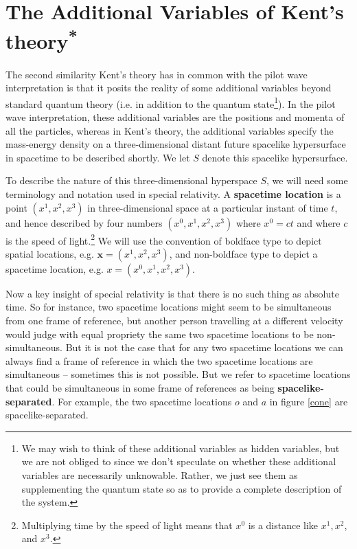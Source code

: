 
\section{The Additional Variables of Kent's theory\textsuperscript{*}\label{additional}}
The second similarity Kent's theory has in common with the pilot wave interpretation is that it posits the reality of some additional variables beyond standard quantum theory (i.e. in addition to the quantum state\footnote{We may wish to think of these additional variables as hidden variables, but we are not obliged to since we don't speculate on whether these additional variables are necessarily unknowable. Rather, we just see them as supplementing the quantum state so as to provide a complete description of the system.}). In the pilot wave interpretation, these additional variables are the positions and momenta of all the particles, whereas in Kent's theory, the additional variables specify the mass-energy density on a three-dimensional distant future spacelike hypersurface in spacetime to be described shortly. We let $S$ denote this spacelike hypersurface.

To describe the nature of this three-dimensional hyperspace $S$, we will need some terminology and notation used in special relativity. A \textbf{spacetime location} is a point $(x^1,x^2,x^3)$ in three-dimensional space at a particular instant of time $t$, and hence described by four numbers $(x^0,x^1,x^2,x^3)$ where $x^0=c t$ and where $c$ is the speed of light.\footnote{Multiplying time by the speed of light means that $x^0$ is a distance like $x^1,x^2$, and $x^3$. } We will use the convention of boldface type to depict spatial locations, e.g. $\bm{x}=(x^1,x^2,x^3)$, and non-boldface type to depict a spacetime location, e.g. $x=(x^0,x^1,x^2,x^3)$. 

Now a key insight of special relativity is that there is no such thing as absolute time. So for instance, two spacetime locations might seem to be simultaneous from one frame of reference, but another person travelling at a different velocity would judge with equal propriety the same two spacetime locations to be non-simultaneous. But it is not the case that for any two spacetime locations we can always find a frame of reference in which the two spacetime locations are simultaneous -- sometimes this is not possible. But we refer to spacetime locations that could be simultaneous in some frame of references as being \textbf{spacelike-separated}. For example, the two spacetime locations $o$ and $a           $  in figure \ref{cone} are spacelike-separated. 

